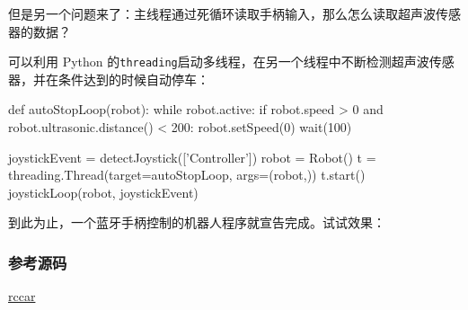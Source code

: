 但是另一个问题来了：主线程通过死循环读取手柄输入，那么怎么读取超声波传感器的数据？

可以利用 Python
的\texttt{threading}启动多线程，在另一个线程中不断检测超声波传感器，并在条件达到的时候自动停车：

\begin{pythoncode}
def autoStopLoop(robot):
    while robot.active:
        if robot.speed > 0 and robot.ultrasonic.distance() < 200:
            robot.setSpeed(0)
        wait(100)

joystickEvent = detectJoystick(['Controller'])
robot = Robot()
t = threading.Thread(target=autoStopLoop, args=(robot,))
t.start()
joystickLoop(robot, joystickEvent)
\end{pythoncode}

到此为止，一个蓝牙手柄控制的机器人程序就宣告完成。试试效果：

\hypertarget{ux53c2ux8003ux6e90ux7801}{%
\subsubsection{参考源码}\label{ux53c2ux8003ux6e90ux7801}}

\href{https://github.com/michaelliao/learn-python3/tree/master/samples/micropython/rccar}{rccar}

